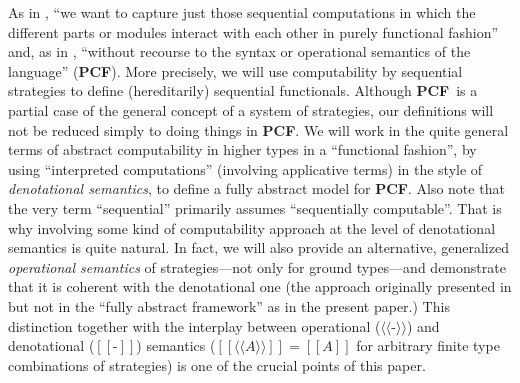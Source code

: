 \documentclass[fleqn]{LMCS}
\theoremstyle{plain}\newtheorem{satz}[thm]{Satz}
\theoremstyle{plain}\newtheorem{hyp}[thm]{Hypothesis}
\theoremstyle{plain}\newtheorem{hyps}[thm]{Hypotheses}
\theoremstyle{definition}\newtheorem{note}[thm]{Note}
\newcommand{\defis}{\mbox{-}}
\newcommand{\lla}{\langle\!\langle}
\newcommand{\rra}{\rangle\!\rangle}
\newcommand{\Osem}[1]{\lla #1 \rra}
\newcommand{\Dsem}[1]{[\![ #1 ]\!]}
\newcommand{\PCF}{\mbox{\bf PCF}}
\newcommand{\?}{\mbox{?}}
\begin{document}
As in \cite{Abramsky-Jagadeesan2000}, ``we want to capture just those 
sequential computations in which the different parts 
or modules interact with each other in purely functional 
fashion'' and, as in \cite{Hyland-Ong2000}, ``without 
recourse to the syntax or operational semantics 
of the language'' (\PCF). More precisely, 
we will use computability by sequential strategies to define (hereditarily) 
sequential functionals. 
Although  
\PCF\ is a partial case of the general concept of a system 
of strategies, our definitions will not be reduced simply to doing things in \PCF. 
We will work in the quite general 
terms of abstract computability in higher types 
in a ``functional fashion'', by using ``interpreted computations'' 
(involving applicative terms) in the style of \emph{denotational semantics},
to define a fully abstract 
model for \PCF. 
Also note that the very term ``sequential'' primarily assumes 
``sequentially computable''. That is why involving some kind of 
computability approach 
at the level of denotational semantics is quite natural. In fact, we 
will also provide an alternative, generalized \emph{operational semantics} 
of strategies---not only for ground types---and 
demonstrate that it is coherent with the denotational one (the approach 
originally presented in \cite{Saz76SMZH} 
but not in the ``fully abstract framework'' 
as in the present paper.)
This distinction together with the interplay 
between operational ($\Osem{\defis}$) and denotational ($\Dsem{\defis}$) semantics 
($\Dsem{\Osem{A}}=\Dsem{A}$ for arbitrary finite type combinations of strategies) 
is one of the crucial points 
of this paper. 
\end{document}
